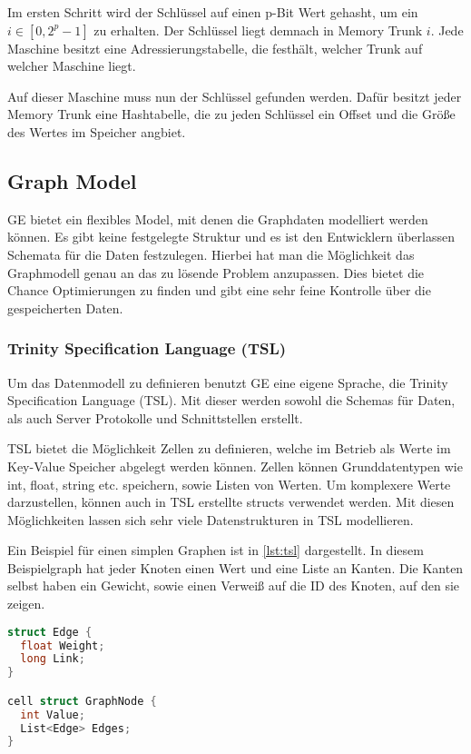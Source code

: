 Im ersten Schritt wird der Schlüssel auf einen p-Bit Wert gehasht, um ein  $ i \in [0, 2^{p} - 1] $ zu erhalten. Der Schlüssel liegt demnach in
Memory Trunk $ i $. Jede Maschine besitzt eine Adressierungstabelle, die festhält, welcher Trunk auf welcher Maschine liegt.

Auf dieser Maschine muss nun der Schlüssel gefunden werden. Dafür besitzt jeder Memory Trunk eine Hashtabelle, die zu jeden Schlüssel
ein Offset und die Größe des Wertes im Speicher angbiet.

\subsection{Graph Model}

GE bietet ein flexibles Model, mit denen die Graphdaten modelliert werden können. Es gibt keine festgelegte Struktur und es ist den Entwicklern
überlassen Schemata für die Daten festzulegen. Hierbei hat man die Möglichkeit das Graphmodell genau an das zu lösende Problem anzupassen.
Dies bietet die Chance Optimierungen zu finden und gibt eine sehr feine Kontrolle über die gespeicherten Daten.

\subsubsection{Trinity Specification Language (TSL)}

Um das Datenmodell zu definieren benutzt GE eine eigene Sprache, die Trinity Specification Language (TSL). Mit dieser werden sowohl die Schemas
für Daten, als auch Server Protokolle und Schnittstellen erstellt. 

TSL bietet die Möglichkeit Zellen zu definieren, welche im Betrieb als Werte im Key-Value Speicher abgelegt werden können.
Zellen können Grunddatentypen wie int, float, string etc. speichern, sowie Listen von Werten. Um komplexere Werte darzustellen, können auch in TSL erstellte structs verwendet werden.
Mit diesen Möglichkeiten lassen sich sehr viele Datenstrukturen in TSL modellieren. 

Ein Beispiel für einen simplen Graphen ist in  \ref{lst:tsl} dargestellt. In diesem Beispielgraph hat jeder Knoten 
einen Wert und eine Liste an Kanten. Die Kanten selbst haben ein Gewicht, sowie einen Verweiß auf die ID des Knoten, auf den sie zeigen.

\begin{lstlisting}[language=c,label={lst:tsl}, caption={Beispiel für einen in TSL definierte Graphenstruktur}]
struct Edge {
  float Weight;
  long Link;
}

cell struct GraphNode {
  int Value;
  List<Edge> Edges;
}
\end{lstlisting}



